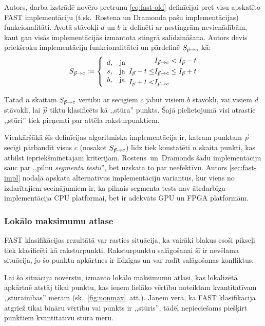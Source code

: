 Autors, darba izstrādē novēro pretrunu \eqref{eq:fast-old} definīcijai pret
visu apskatīto
FAST implementāciju (t.sk.~Rostena un Dramonda\cite{FAST} pašu implementācijas)
funkcionalitāti. Avotā \cite{FAST} stāvokļi $d$ un $b$ ir definēti ar
nestingrām nevienādībām, kaut gan visās implementācijās izmantota stingrā
salīdzināšana. Autors devis priekšroku implementāciju funkcionalitātei un
pārdefinē ${S_{\vec{p} \to c}}$ kā:
\begin{equation}\label{eq:fast}
	{S_{\vec{p} \to c}} := \left\{
		\begin{array}{c}
			d\text{,}\quad\text{ja}\\
			s\text{,}\quad\text{ja}\\
			b\text{,}\quad\text{ja}
		\end{array}
		\begin{aligned}
			           & {I_{\vec{p} \to c}} < I_{\vec{p}}-t \\
			I_{\vec{p}}-t \leq & {I_{\vec{p} \to c}} \leq I_{\vec{p}}+t \\
			   I_{\vec{p}}+t < & {I_{\vec{p} \to c}}
		\end{aligned}
		\right.
\end{equation}

Tātad $n$ skaitam ${S_{\vec{p} \to c}}$ vērtību ar secīgiem $c$ jābūt visiem
$b$ stāvoklī, vai visiem $d$ stāvoklī, lai $\vec{p}$ tiktu klasificēts kā
,,stūra'' punkts. Šajā pielietojumā visi atrastie ,,stūri'' tiek pieņemti
par attēla raksturpunktiem.

Vienkāršākā šīs definīcijas algoritmiska implementācija ir, katram
punktam $\vec{p}$ secīgi pārbaudīt visus $c$ (nosakot ${S_{\vec{p} \to c}}$)
līdz tiek konstatēti $n$ skaita punkti, kas atbilst iepriekšminētajam
kritērijam. Rostens~un~Dramonds\cite{FAST} šādu implementāciju sauc par
,,pilnu \emph{segmenta testu}'', bet uzskata to par neefektīvu.
Autors \ref{sec:fast-impl} nodaļā apskata alternatīvus implementāciju
variantus, kur viens no izdarītajiem secinājumiem ir, ka pilnais
segmenta tests nav ātrdarbīga implementācija CPU platformai, bet ir
adekvāts GPU un FPGA platformām.

\subsubsection{Lokālo maksimumu atlase}
FAST klasifikācijas rezultātā var rasties situācija, ka vairāki 
blakus esoši pikseļi tiek klasificēti kā raksturpunkti.
Raksturpunktu salāgošanai šī ir nevēlama situācija, jo šo punktu apkārtnes
ir līdzīgas un var radīt salāgošanas konfliktus.

Lai šo situāciju novērstu, izmanto lokālo maksimumu atlasi, kas lokalizētā
apkārtnē atstāj tikai punktu, kas ieņem lielāko vērtību noteiktam
kvantitatīvam ,,stūrainības'' mēram (sk.~\ref{fig:nonmax}~att.).
Jāņem vērā, ka FAST
klasifikācija atgriež tikai bināru vērtību vai punkts ir ,,stūris'',
tādēļ nepieciešams piešķirt punktiem kvantitatīvu stūra mēru.

